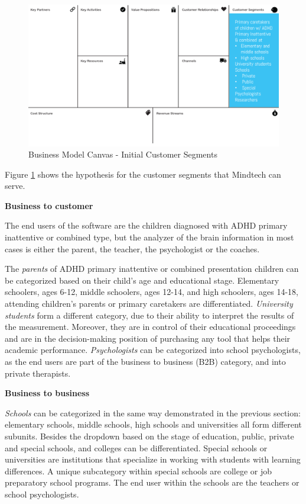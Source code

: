 \documentclass[letterpaper,10pt]{article}
\begin{document}
\begin{figure}[!htb]
\centering
\includegraphics[scale=0.5]{cust.PNG}
\caption{Business Model Canvas - Initial Customer Segments}
\label{img:BMC_cs}
\end{figure}


Figure \ref{img:BMC_cs} shows the hypothesis for the customer segments that Mindtech can serve.

\textbf{Business to customer}

The end users of the software are the children diagnosed with ADHD primary inattentive or combined type, but the analyzer of the brain information in most cases is either the parent, the teacher, the psychologist or the coaches.

The \textit{parents} of ADHD primary inattentive or combined presentation children can be categorized based on their child's age and educational stage. Elementary schoolers, ages 6-12, middle schoolers, ages 12-14, and high schoolers, ages 14-18, attending children's parents or primary caretakers are differentiated. \textit{University students} form a different category, due to their ability to interpret the results of the measurement. Moreover, they are in control of their educational proceedings and are in the decision-making position of purchasing any tool that helps their academic performance. 
\textit{Psychologists} can be categorized into school psychologists, as the end users are part of the business to business (B2B) category, and into private therapists. 


\textbf{Business to business}

\textit{Schools} can be categorized in the same way demonstrated in the previous section: elementary schools, middle schools, high schools and universities all form different subunits. Besides the dropdown based on the stage of education, public, private and special schools, and colleges can be differentiated. 
Special schools or universities are institutions that specialize in working with students with learning differences. A unique subcategory within special schools are college or job preparatory school programs. 
The end user within the schools are the teachers or school psychologists.
\end{document}
